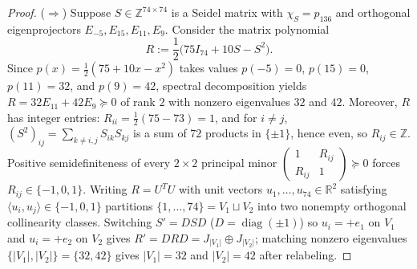 \documentclass[11pt,reqno]{amsart}
\theoremstyle{definition}
\theoremstyle{remark}
\numberwithin{equation}{section}
\numberwithin{table}{section}
\DeclareMathOperator{\diag}{diag}
\begin{document}
\begin{proof}
($\Rightarrow$) Suppose $S \in \mathbb{Z}^{74 \times 74}$ is a Seidel matrix with $\chi_S = p_{136}$ and orthogonal eigenprojectors $E_{-5}, E_{15}, E_{11}, E_9$. Consider the matrix polynomial
\[
  R := \frac{1}{2}\big(75I_{74} + 10S - S^2\big).
\]
Since $p(x) = \frac{1}{2}(75 + 10x - x^2)$ takes values $p(-5) = 0$, $p(15) = 0$, $p(11) = 32$, and $p(9) = 42$, spectral decomposition yields $R = 32 E_{11} + 42 E_9 \succeq 0$ of rank $2$ with nonzero eigenvalues $32$ and $42$. Moreover, $R$ has integer entries: $R_{ii} = \frac{1}{2}(75 - 73) = 1$, and for $i \neq j$, $(S^2)_{ij} = \sum_{k \neq i,j} S_{ik}S_{kj}$ is a sum of $72$ products in $\{\pm 1\}$, hence even, so $R_{ij} \in \mathbb{Z}$. Positive semidefiniteness of every $2 \times 2$ principal minor $\left(\begin{smallmatrix} 1 & R_{ij} \\ R_{ij} & 1 \end{smallmatrix}\right) \succeq 0$ forces $R_{ij} \in \{-1, 0, 1\}$. Writing $R = U^T U$ with unit vectors $u_1, \dots, u_{74} \in \mathbb{R}^2$ satisfying $\langle u_i, u_j \rangle \in \{-1, 0, 1\}$ partitions $\{1, \dots, 74\} = V_1 \sqcup V_2$ into two nonempty orthogonal collinearity classes. Switching $S' = DSD$ ($D = \diag(\pm 1)$) so $u_i = +e_1$ on $V_1$ and $u_i = +e_2$ on $V_2$ gives $R' = D R D = J_{|V_1|} \oplus J_{|V_2|}$; matching nonzero eigenvalues $\{|V_1|, |V_2|\} = \{32, 42\}$ gives $|V_1| = 32$ and $|V_2| = 42$ after relabeling.


\end{proof}
\end{document}
